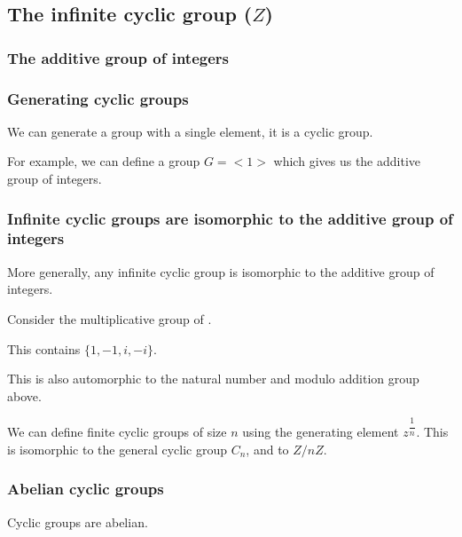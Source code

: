 
\subsection{The infinite cyclic group (\(Z\))}

\subsubsection{The additive group of integers}

\subsubsection{Generating cyclic groups}

We can generate a group with a single element, it is a cyclic group.

For example, we can define a group \(G=<1>\) which gives us the additive group of integers.

\subsubsection{Infinite cyclic groups are isomorphic to the additive group of integers}

More generally, any infinite cyclic group is isomorphic to the additive group of integers.

Consider the multiplicative group of \(< i >\).

This contains \(\{1,-1,i,-i \} \).

This is also automorphic to the natural number and modulo addition group above.

We can define finite cyclic groups of size \(n\) using the generating element \(z^{\dfrac{1}{n}}\). This is isomorphic to the general cyclic group \(C_n\), and to \(Z/nZ\).

\subsubsection{Abelian cyclic groups}

Cyclic groups are abelian.

